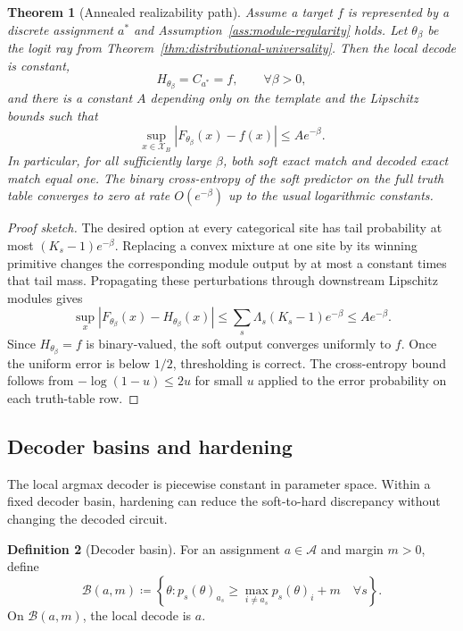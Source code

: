 \documentclass[11pt]{article}
\newtheorem{theorem}{Theorem}[section]
\theoremstyle{definition}
\newtheorem{definition}[theorem]{Definition}
\theoremstyle{remark}
\newcommand{\X}{\mathcal X}
\newcommand{\A}{\mathcal A}
\begin{document}
\begin{theorem}[Annealed realizability path]
\label{thm:annealed-path}
Assume a target $f$ is represented by a discrete assignment $a^*$ and Assumption~\ref{ass:module-regularity} holds.  Let $\theta_\beta$ be the logit ray from Theorem~\ref{thm:distributional-universality}.  Then the local decode is constant,
\[
    H_{\theta_\beta}=C_{a^*}=f,
    \qquad \forall \beta>0,
\]
and there is a constant $A$ depending only on the template and the Lipschitz bounds such that
\[
    \sup_{x\in\X_B}|F_{\theta_\beta}(x)-f(x)|
    \le
    A e^{-\beta}.
\]
In particular, for all sufficiently large $\beta$, both soft exact match and decoded exact match equal one.  The binary cross-entropy of the soft predictor on the full truth table converges to zero at rate $O(e^{-\beta})$ up to the usual logarithmic constants.
\end{theorem}

\begin{proof}[Proof sketch]
The desired option at every categorical site has tail probability at most $(K_s-1)e^{-\beta}$.  Replacing a convex mixture at one site by its winning primitive changes the corresponding module output by at most a constant times that tail mass.  Propagating these perturbations through downstream Lipschitz modules gives
\[
\sup_x |F_{\theta_\beta}(x)-H_{\theta_\beta}(x)|
\le
\sum_s \Lambda_s (K_s-1)e^{-\beta}
\le A e^{-\beta}.
\]
Since $H_{\theta_\beta}=f$ is binary-valued, the soft output converges uniformly to $f$.  Once the uniform error is below $1/2$, thresholding is correct.  The cross-entropy bound follows from $-\log(1-u)\le 2u$ for small $u$ applied to the error probability on each truth-table row.
\end{proof}

\subsection{Decoder basins and hardening}

The local argmax decoder is piecewise constant in parameter space.  Within a fixed decoder basin, hardening can reduce the soft-to-hard discrepancy without changing the decoded circuit.

\begin{definition}[Decoder basin]
For an assignment $a\in\A$ and margin $m>0$, define
\[
    \mathcal B(a,m)
    \coloneqq
    \left\{\theta:
    p_s(\theta)_{a_s}\ge \max_{i\ne a_s}p_s(\theta)_i+m\quad\forall s
    \right\}.
\]
On $\mathcal B(a,m)$, the local decode is $a$.
\end{definition}
\end{document}
